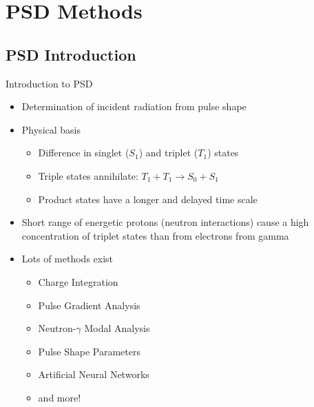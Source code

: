 
% 
%
\section{PSD Methods}


\subsection*{PSD Introduction}
\begin{frame}{Introduction to PSD}
	\begin{itemize}
		\small
		\item Determination of incident radiation from pulse shape
		\item Physical basis
		\begin{itemize}
			\tiny
			\item Difference in singlet ($S_1$) and triplet ($T_1$) states \cite{zaitseva_plastic_2012}
			\item Triple states annihilate: $T_1 + T_1 \to S_0 + S_1$
			\item Product states have a longer and delayed time scale
		\end{itemize}
		\small
		\item Short range of energetic protons (neutron interactions) cause a high concentration of triplet states than from electrons from gamma
		\item Lots of methods exist \cite{ambers_hybrid_2011, gamage_comparison_2011, miller_digital_2007}
		\begin{itemize}
			\tiny
			\item Charge Integration
			\item Pulse Gradient Analysis
			\item Neutron-$\gamma$ Modal Analysis
			\item Pulse Shape Parameters
			\item Artificial Neural Networks
			\item and more!
		\end{itemize}
	\end{itemize}
\end{frame}
